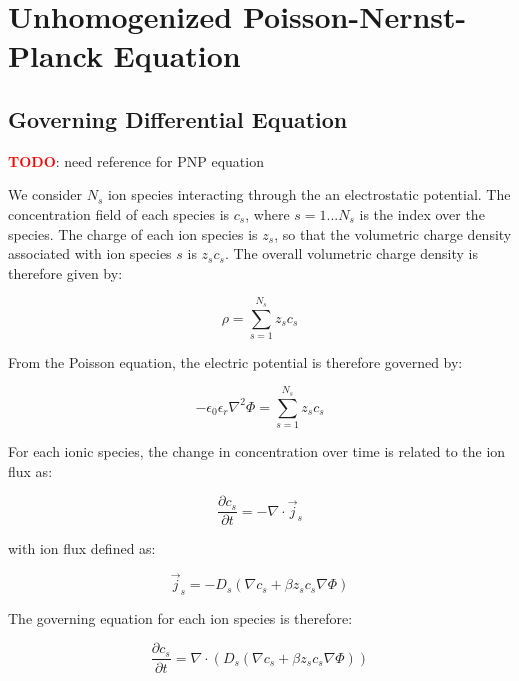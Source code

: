 
\section{Unhomogenized Poisson-Nernst-Planck Equation}\label{sec:unhom_pnp}

\subsection{Governing Differential Equation}\label{subsec:unhom_pnp_gov}


\textcolor{red}{\textbf{TODO}}: need reference for PNP equation

We consider $N_s$ ion species interacting through the an electrostatic potential.
The concentration field of each species is $c_s$, where $s=1 ... N_s$ is the index over the species.
The charge of each ion species is $z_s$, so that the volumetric charge density associated
with ion species $s$ is $z_s c_s$.
The overall volumetric charge density is therefore given by:

\begin{equation}
\rho = \sum_{s=1}^{N_s}z_s c_s
\end{equation}

From the Poisson equation, the electric potential is therefore governed by:

\begin{equation}
-\epsilon_{0}\epsilon_{r} \nabla^2 \Phi = \sum_{s=1}^{N_s}z_s c_s
\end{equation}

For each ionic species, the change in concentration over time is related to the ion flux as:

\begin{equation} 
\frac{\partial c_s}{\partial t} = - \nabla \cdot \vec{j}_s
\end{equation} 

with ion flux defined as:

\begin{equation}
\vec{j}_s  = -D_s \left( \nabla c_s + \beta z_s c_s \nabla \Phi \right)
\end{equation}

The governing equation for each ion species is therefore:

\begin{equation}
\frac{\partial c_s}{\partial t} = \nabla \cdot \left(
D_s \left( \nabla c_s + \beta z_s c_s \nabla \Phi \right)
\right)
\end{equation}

